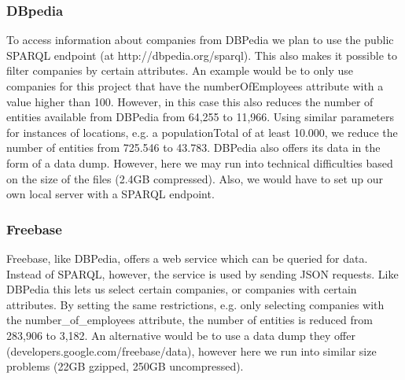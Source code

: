 \subsubsection{DBpedia}
To access information about companies from DBPedia we plan to use the public SPARQL endpoint (at http://dbpedia.org/sparql). This also makes it possible to filter companies by certain attributes. An example would be to only use companies for this project that have the numberOfEmployees attribute with a value higher than 100. However, in this case this also reduces the number of entities available from DBPedia from 64,255 to 11,966. Using similar parameters for instances of locations, e.g. a populationTotal of at least 10.000, we reduce the number of entities from 725.546 to 43.783.
DBPedia also offers its data in the form of a data dump. However, here we may run into technical difficulties based on the size of the files (2.4GB compressed). Also, we would have to set up our own local server with a SPARQL endpoint.
\subsubsection{Freebase}
Freebase, like DBPedia, offers a web service which can be queried for data. Instead of SPARQL, however, the service is used by sending JSON requests. Like DBPedia this lets us select certain companies, or companies with certain attributes. By setting the same restrictions, e.g. only selecting companies with the number_of_employees attribute, the number of entities is reduced from 283,906 to 3,182.
An alternative would be to use a data dump they offer (developers.google.com/freebase/data), however here we run into similar size problems (22GB gzipped, 250GB uncompressed).